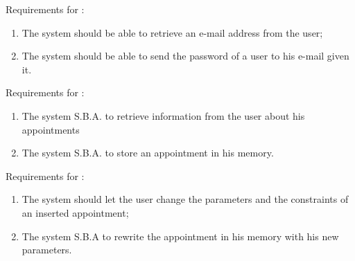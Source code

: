 Requirements for :
\begin{enumerate}[resume]
\renewcommand\labelenumi{\textbf{R\theenumi}}
\item The system should be able to retrieve an e-mail address from the user; \label{req:R6}
\item The system should be able to send the password of a user to his e-mail given it. \label{req:R7}
\end{enumerate}

Requirements for :
\begin{enumerate}[resume]
\renewcommand\labelenumi{\textbf{R\theenumi}}
\item The system S.B.A. to retrieve information from the user about his appointments \label{req:R8}
\item The system S.B.A. to store an appointment in his memory. \label{req:R9} 
\end{enumerate}

Requirements for :
\begin{enumerate}[resume]
\renewcommand\labelenumi{\textbf{R\theenumi}}
\item The system should let the user change the parameters and the constraints of an inserted appointment; \label{req:R10}
\item The system S.B.A to rewrite the appointment in his memory with his new parameters. \label{req:R11}
\end{enumerate}

